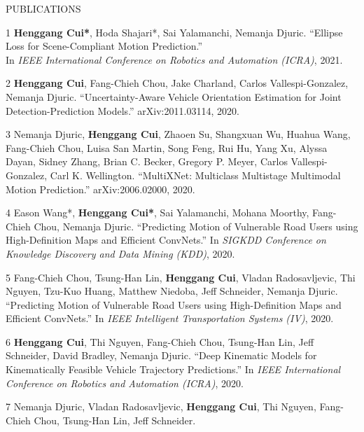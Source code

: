 \documentclass{resume} %
\begin{document}


\begin{rSection}{PUBLICATIONS}
\vspace{-.1in}
\footnotesize{
    \item
    [1]
        {\bf Henggang Cui*}, Hoda Shajari*, Sai Yalamanchi, Nemanja Djuric.
        ``Ellipse Loss for Scene-Compliant Motion Prediction.'' \\
        In \emph{IEEE International Conference on Robotics and Automation (ICRA)}, 2021.
    \item
    [2]
        {\bf Henggang Cui}, Fang-Chieh Chou, Jake Charland, Carlos Vallespi-Gonzalez, Nemanja Djuric.
        ``Uncertainty-Aware Vehicle Orientation Estimation for Joint Detection-Prediction Models.''
        arXiv:2011.03114, 2020.
    \item
    [3]
        Nemanja Djuric, {\bf Henggang Cui}, Zhaoen Su, Shangxuan Wu, Huahua Wang, Fang-Chieh Chou, Luisa San Martin, Song Feng, Rui Hu, Yang Xu, Alyssa Dayan, Sidney Zhang, Brian C. Becker, Gregory P. Meyer, Carlos Vallespi-Gonzalez, Carl K. Wellington.
        ``MultiXNet: Multiclass Multistage Multimodal Motion Prediction.''
        arXiv:2006.02000, 2020.
    \item
    [4]
        Eason Wang*, {\bf Henggang Cui*}, Sai Yalamanchi, Mohana Moorthy, Fang-Chieh Chou, Nemanja Djuric.
        ``Predicting Motion of Vulnerable Road Users using High-Definition Maps and Efficient ConvNets.''
        In \emph{SIGKDD Conference on Knowledge Discovery and Data Mining (KDD)}, 2020.
    \item
    [5]
        Fang-Chieh Chou, Tsung-Han Lin, {\bf Henggang Cui}, Vladan Radosavljevic, Thi Nguyen, Tzu-Kuo Huang, Matthew Niedoba, Jeff Schneider, Nemanja Djuric.
        ``Predicting Motion of Vulnerable Road Users using High-Definition Maps and Efficient ConvNets.''
        In \emph{IEEE Intelligent Transportation Systems (IV)}, 2020.
    \item
    [6]
        {\bf Henggang Cui}, Thi Nguyen, Fang-Chieh Chou, Tsung-Han Lin, Jeff Schneider, David Bradley, Nemanja Djuric.
        ``Deep Kinematic Models for Kinematically Feasible Vehicle Trajectory Predictions.''
        In \emph{IEEE International Conference on Robotics and Automation (ICRA)}, 2020.
    \item
    [7]
        Nemanja Djuric, Vladan Radosavljevic, {\bf Henggang Cui}, Thi Nguyen, Fang-Chieh Chou, Tsung-Han Lin, Jeff Schneider.
}
\end{rSection}
\end{document}
